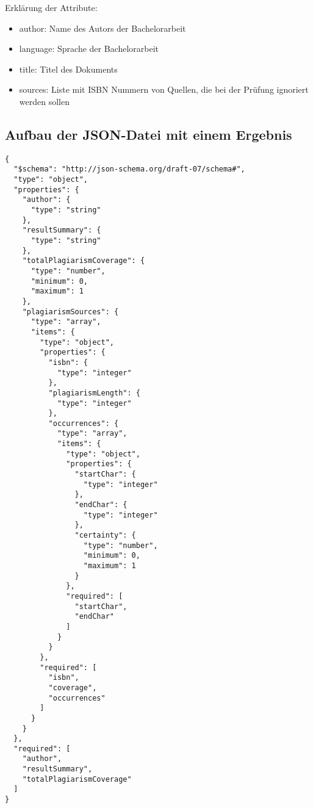 Erklärung der Attribute:
\begin{itemize}
    \item author: Name des Autors der Bachelorarbeit
    \item language: Sprache der Bachelorarbeit
    \item title: Titel des Dokuments
    \item sources: Liste mit ISBN Nummern von Quellen, die bei der Prüfung ignoriert werden sollen
\end{itemize}

\subsection{Aufbau der JSON-Datei mit einem Ergebnis}\label{subsec:json-ergebnis}
\begin{lstlisting}[caption={JSON-Datei mit einem Ergebnis},captionpos=b,label={lst:json-ergebnis}]
{
  "$schema": "http://json-schema.org/draft-07/schema#",
  "type": "object",
  "properties": {
    "author": {
      "type": "string"
    },
    "resultSummary": {
      "type": "string"
    },
    "totalPlagiarismCoverage": {
      "type": "number",
      "minimum": 0,
      "maximum": 1
    },
    "plagiarismSources": {
      "type": "array",
      "items": {
        "type": "object",
        "properties": {
          "isbn": {
            "type": "integer"
          },
          "plagiarismLength": {
            "type": "integer"
          },
          "occurrences": {
            "type": "array",
            "items": {
              "type": "object",
              "properties": {
                "startChar": {
                  "type": "integer"
                },
                "endChar": {
                  "type": "integer"
                },
                "certainty": {
                  "type": "number",
                  "minimum": 0,
                  "maximum": 1
                }
              },
              "required": [
                "startChar",
                "endChar"
              ]
            }
          }
        },
        "required": [
          "isbn",
          "coverage",
          "occurrences"
        ]
      }
    }
  },
  "required": [
    "author",
    "resultSummary",
    "totalPlagiarismCoverage"
  ]
}
\end{lstlisting}

